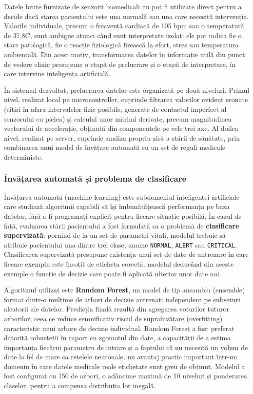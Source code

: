 ﻿\documentclass[12pt,a4paper,twoside]{article}
\begin{document}
Datele brute furnizate de senzorii biomedicali nu pot fi utilizate direct pentru a decide dacă starea pacientului este una normală sau una care necesită intervenție. Valorile individuale, precum o frecvență cardiacă de 105 bpm sau o temperatură de 37,8\textdegree C, sunt ambigue atunci când sunt interpretate izolat: ele pot indica fie o stare patologică, fie o reacție fiziologică firească la efort, stres sau temperatura ambientală. Din acest motiv, transformarea datelor în informație utilă din punct de vedere clinic presupune o etapă de prelucrare și o etapă de interpretare, în care intervine inteligența artificială.

În sistemul dezvoltat, prelucrarea datelor este organizată pe două niveluri. Primul nivel, realizat local pe microcontroller, cuprinde filtrarea valorilor evident eronate (citiri în afara intervalelor fizic posibile, generate de contactul imperfect al senzorului cu pielea) și calculul unor mărimi derivate, precum magnitudinea vectorului de accelerație, obținută din componentele pe cele trei axe. Al doilea nivel, realizat pe server, cuprinde analiza propriu-zisă a stării de sănătate, prin combinarea unui model de învățare automată cu un set de reguli medicale deterministe.

\subsubsection{Învățarea automată și problema de clasificare}

Învățarea automată (machine learning) este subdomeniul inteligenței artificiale care studiază algoritmii capabili să își îmbunătățească performanța pe baza datelor, fără a fi programați explicit pentru fiecare situație posibilă. În cazul de față, evaluarea stării pacientului a fost formulată ca o problemă de \textbf{clasificare supervizată}: pornind de la un set de parametri vitali, modelul trebuie să atribuie pacientului una dintre trei clase, anume \texttt{NORMAL}, \texttt{ALERT} sau \texttt{CRITICAL}. Clasificarea supervizată presupune existența unui set de date de antrenare în care fiecare exemplu este însoțit de eticheta corectă, modelul deducând din aceste exemple o funcție de decizie care poate fi aplicată ulterior unor date noi.

Algoritmul utilizat este \textbf{Random Forest}, un model de tip ansamblu (ensemble) format dintr-o mulțime de arbori de decizie antrenați independent pe subseturi aleatorii ale datelor. Predicția finală rezultă din agregarea voturilor tuturor arborilor, ceea ce reduce semnificativ riscul de supraînvățare (overfitting) caracteristic unui arbore de decizie individual. Random Forest a fost preferat datorită robusteții în raport cu zgomotul din date, a capacității de a estima importanța fiecărui parametru de intrare și a faptului că nu necesită un volum de date la fel de mare ca rețelele neuronale, un avantaj practic important într-un domeniu în care datele medicale reale etichetate sunt greu de obținut. Modelul a fost configurat cu 150 de arbori, o adâncime maximă de 10 niveluri și ponderarea claselor, pentru a compensa distribuția lor inegală.
\end{document}
